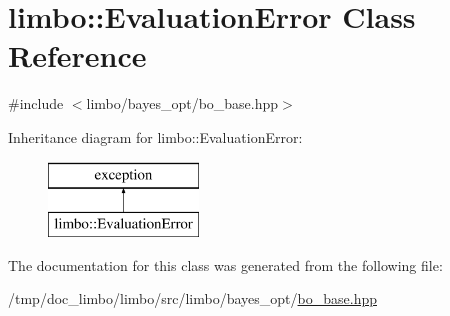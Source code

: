 \hypertarget{classlimbo_1_1_evaluation_error}{}\section{limbo\+:\+:Evaluation\+Error Class Reference}
\label{classlimbo_1_1_evaluation_error}


{\ttfamily \#include $<$limbo/bayes\+\_\+opt/bo\+\_\+base.\+hpp$>$}

Inheritance diagram for limbo\+:\+:Evaluation\+Error\+:\begin{figure}[H]
\begin{center}
\leavevmode
\includegraphics[height=2.000000cm]{classlimbo_1_1_evaluation_error}
\end{center}
\end{figure}


The documentation for this class was generated from the following file\+:\begin{DoxyCompactItemize}
\item 
/tmp/doc\+\_\+limbo/limbo/src/limbo/bayes\+\_\+opt/\hyperlink{bo__base_8hpp}{bo\+\_\+base.\+hpp}\end{DoxyCompactItemize}
